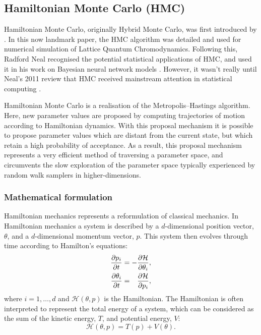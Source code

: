 \subsection{Hamiltonian Monte Carlo (HMC)}
\label{ssec:hmc}

Hamiltonian Monte Carlo, originally Hybrid Monte Carlo, was first introduced by
\textcite{duane87}. In this now landmark paper, the HMC algorithm was detailed
and used for numerical simulation of Lattice Quantum Chromodynamics. Following
this, Radford Neal recognised the potential statistical applications of HMC,
and used it in his work on Bayesian neural network models \parencite{neal95}.
However, it wasn't really until Neal's 2011 review \parencite{neal11} that HMC
received mainstream attention in statistical computing
\parencite{betancourt18}.

Hamiltonian Monte Carlo is a realisation of the Metropolis--Hastings algorithm.
Here, new parameter values are proposed by computing trajectories of motion
according to Hamiltonian dynamics. With this proposal mechanism it is possible
to propose parameter values which are distant from the current state, but which
retain a high probability of acceptance. As a result, this proposal mechanism
represents a very efficient method of traversing a parameter space, and
circumvents the slow exploration of the parameter space typically experienced
by random walk samplers in higher-dimensions.

\subsubsection{Mathematical formulation}

Hamiltonian mechanics represents a reformulation of classical mechanics. In
Hamiltonian mechanics a system is described by a $d$-dimensional position
vector, $\theta$, and a $d$-dimensional momentum vector, $p$. This system then
evolves through time according to Hamilton's equations:
\begin{align}
  \begin{split}
    \pdv{p_i}{t}      &= - \pdv{\mathcal{H}}{\theta_i},      \\
    \pdv{\theta_i}{t} &= \hphantom{-} \pdv{\mathcal{H}}{p_i},
  \end{split}
\end{align}
where $i=1,\ldots,d$ and $\mathcal{H}(\theta, p)$ is the Hamiltonian. The
Hamiltonian is often interpreted to represent the total energy of a system,
which can be considered as the sum of the kinetic energy, $T$, and potential
energy, $V$:
\begin{equation}
  \label{eq:hamiltonian_decomp}
  \mathcal{H}(\theta, p) = T(p) + V(\theta).
\end{equation}


